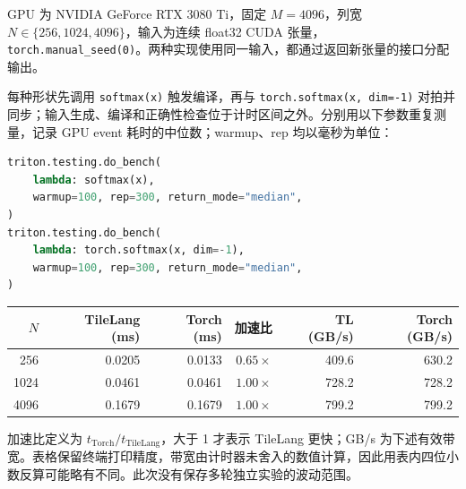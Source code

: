 \documentclass[11pt,a4paper,fontset=none]{ctexart}
\begin{document}
\begin{tcolorbox}[title={7.7 softmax 与 PyTorch 性能对比（2026-09-11）},breakable]
GPU 为 NVIDIA GeForce RTX 3080 Ti，固定 $M=4096$，列宽 $N\in\{256,1024,4096\}$，输入为连续 float32 CUDA 张量，\texttt{torch.manual\_seed(0)}。两种实现使用同一输入，都通过返回新张量的接口分配输出。

每种形状先调用 \texttt{softmax(x)} 触发编译，再与 \texttt{torch.softmax(x, dim=-1)} 对拍并同步；输入生成、编译和正确性检查位于计时区间之外。分别用以下参数重复测量，记录 GPU event 耗时的中位数；warmup、rep 均以毫秒为单位：
\begin{lstlisting}[language=Python]
triton.testing.do_bench(
    lambda: softmax(x),
    warmup=100, rep=300, return_mode="median",
)
triton.testing.do_bench(
    lambda: torch.softmax(x, dim=-1),
    warmup=100, rep=300, return_mode="median",
)
\end{lstlisting}
\begin{center}\small
\setlength{\tabcolsep}{4pt}
\begin{tabular}{@{}rrrrrr@{}}
\toprule
$N$ & TileLang (ms) & Torch (ms) & 加速比 & TL (GB/s) & Torch (GB/s) \\
\midrule
256  & 0.0205 & 0.0133 & $0.65\times$ & 409.6 & 630.2 \\
1024 & 0.0461 & 0.0461 & $1.00\times$ & 728.2 & 728.2 \\
4096 & 0.1679 & 0.1679 & $1.00\times$ & 799.2 & 799.2 \\
\bottomrule
\end{tabular}
\end{center}
加速比定义为 $t_{\mathrm{Torch}}/t_{\mathrm{TileLang}}$，大于 1 才表示 TileLang 更快；GB/s 为下述有效带宽。表格保留终端打印精度，带宽由计时器未舍入的数值计算，因此用表内四位小数反算可能略有不同。此次没有保存多轮独立实验的波动范围。
\end{tcolorbox}
\end{document}
